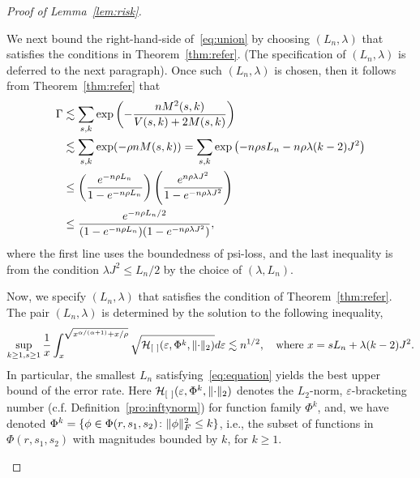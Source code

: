 \documentclass[11pt]{article}
\theoremstyle{plain}
\theoremstyle{definition}
\begin{document}
\begin{proof}[Proof of Lemma~\ref{lem:risk}]
\begin{enumerate}[label={2.\arabic*},wide, labelwidth=!, labelindent=0pt]
We next bound the right-hand-side of~\eqref{eq:union} by choosing $(L_n,\lambda)$ that satisfies the conditions in Theorem~\ref{thm:refer}. (The specification of $(L_n,\lambda)$ is deferred to the next paragraph). Once such $(L_n,\lambda)$ is chosen, then it follows from Theorem~\ref{thm:refer} that
\begin{align}\label{eq:gamma}
\Gamma& \lesssim \sum_{s,k}\exp\left( - {nM^2(s,k)\over V(s,k)+2M(s,k)}\right)\notag \\
&\lesssim \sum_{s,k}\exp(-\rho nM(s,k)) = \sum_{s,k}\exp\left(-n\rho sL_n-n\rho \lambda(k-2)J^2 \right)\notag\\
&\leq \left({e^{-n\rho L_n}\over 1-e^{-n\rho L_n} }\right) \left({e^{n\rho \lambda J^2} \over 1-e^{-n\rho \lambda J^2}}\right)\notag \\ 
&\leq {e^{-n\rho L_n/2}\over (1-e^{-n\rho L_n})(1-e^{-n\rho\lambda J^2})},
\end{align}
where the first line uses the boundedness of psi-loss, and the last inequality is from the condition $\lambda J^2\leq L_n/2$ by the choice of $(\lambda,L_n)$.

Now, we specify $(L_n,\lambda)$ that satisfies the condition of Theorem~\ref{thm:refer}. The pair $(L_n,\lambda)$ is determined by the solution to the following inequality,
\begin{equation}\label{eq:equation}
\sup_{k\geq 1, s\geq 1}{1\over x}\int_{x}^{\sqrt{x^{\alpha/(\alpha+1)}+x/\rho}}\sqrt{\tH_{[\ ]}(\varepsilon, \Phi^{k},\vnormSize{}{\cdot})}d\varepsilon \lesssim n^{1/2}, \quad \text{where }x=sL_n+\lambda (k-2)J^2.
\end{equation}
In particular, the smallest $L_n$ satisfying~\eqref{eq:equation} yields the best upper bound of the error rate. Here $\tH_{[\ ]}(\varepsilon, \Phi^{k}, \vnormSize{}{\cdot})$ denotes the $L_2$-norm, $\varepsilon$-bracketing number (c.f. Definition~\ref{pro:inftynorm}) for function family $\Phi^{k}$, and, we have denoted $\Phi^{k}=\{\phi\in\Phi(r,s_1,s_2)\colon \lVert\phi\rVert_F^2\leq k\}$, i.e., the subset of functions in $\Phi(r,s_1,s_2)$ with magnitudes bounded by $k$, for $k\geq 1$.


\end{enumerate}
\end{proof}
\end{document}

